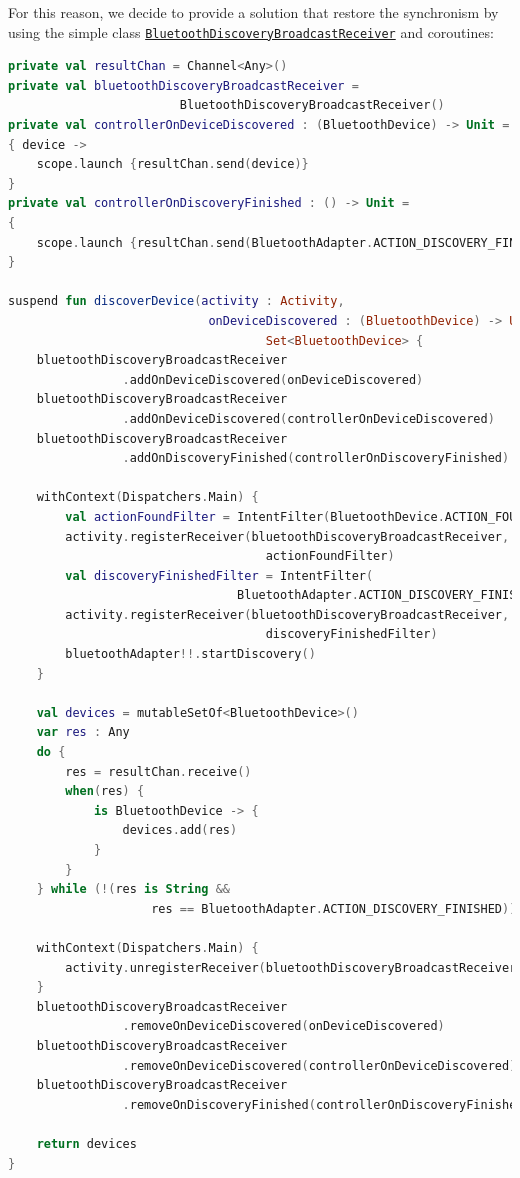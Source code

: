 For this reason, we decide to provide a solution that restore the synchronism by using the simple class \href{https://github.com/LucaLand/MobileSystemsProject-LL/blob/0.9.1/app/src/main/java/it/unibo/mobilesystems/bluetooth/BluetoothDiscoveryBroadcastReceiver.kt}{\texttt{BluetoothDiscoveryBroadcastReceiver}} and coroutines:
\begin{lstlisting}[language=Kotlin]
private val resultChan = Channel<Any>()
private val bluetoothDiscoveryBroadcastReceiver =
						BluetoothDiscoveryBroadcastReceiver()
private val controllerOnDeviceDiscovered : (BluetoothDevice) -> Unit =
{ device ->
	scope.launch {resultChan.send(device)}
}
private val controllerOnDiscoveryFinished : () -> Unit =
{
	scope.launch {resultChan.send(BluetoothAdapter.ACTION_DISCOVERY_FINISHED)}
}
	
suspend fun discoverDevice(activity : Activity,
							onDeviceDiscovered : (BluetoothDevice) -> Unit = {}) :
									Set<BluetoothDevice> {
	bluetoothDiscoveryBroadcastReceiver
				.addOnDeviceDiscovered(onDeviceDiscovered)
	bluetoothDiscoveryBroadcastReceiver
				.addOnDeviceDiscovered(controllerOnDeviceDiscovered)
	bluetoothDiscoveryBroadcastReceiver
				.addOnDiscoveryFinished(controllerOnDiscoveryFinished)
	
	withContext(Dispatchers.Main) {
		val actionFoundFilter = IntentFilter(BluetoothDevice.ACTION_FOUND)
		activity.registerReceiver(bluetoothDiscoveryBroadcastReceiver,
									actionFoundFilter)
		val discoveryFinishedFilter = IntentFilter(
								BluetoothAdapter.ACTION_DISCOVERY_FINISHED)
		activity.registerReceiver(bluetoothDiscoveryBroadcastReceiver,
									discoveryFinishedFilter)
		bluetoothAdapter!!.startDiscovery()
	}

	val devices = mutableSetOf<BluetoothDevice>()
	var res : Any
	do {
		res = resultChan.receive()
		when(res) {
			is BluetoothDevice -> {
				devices.add(res)
			}
		}
	} while (!(res is String &&
					res == BluetoothAdapter.ACTION_DISCOVERY_FINISHED))

	withContext(Dispatchers.Main) {
		activity.unregisterReceiver(bluetoothDiscoveryBroadcastReceiver)
	}
	bluetoothDiscoveryBroadcastReceiver
				.removeOnDeviceDiscovered(onDeviceDiscovered)
	bluetoothDiscoveryBroadcastReceiver
				.removeOnDeviceDiscovered(controllerOnDeviceDiscovered)
	bluetoothDiscoveryBroadcastReceiver
				.removeOnDiscoveryFinished(controllerOnDiscoveryFinished)

	return devices
}
\end{lstlisting}

